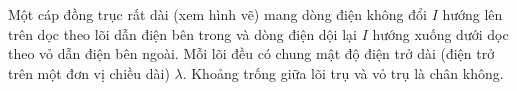 \begin{vd}
Một cáp đồng trục rất dài (xem hình vẽ) mang dòng điện không đổi $I$ hướng lên trên dọc theo lõi dẫn điện bên trong và dòng điện dội lại $I$ hướng xuống dưới dọc theo vỏ dẫn điện bên ngoài. Mỗi lõi đều có chung mật độ điện trở dài (điện trở trên một đơn vị chiều dài) $\lambda$. Khoảng trống giữa lõi trụ và vỏ trụ là chân không.
   \begin{center}



\begin{tikzpicture}[x=0.75pt,y=0.75pt,yscale=-1,xscale=1]


\end{tikzpicture}
\end{center}
\end{vd}

